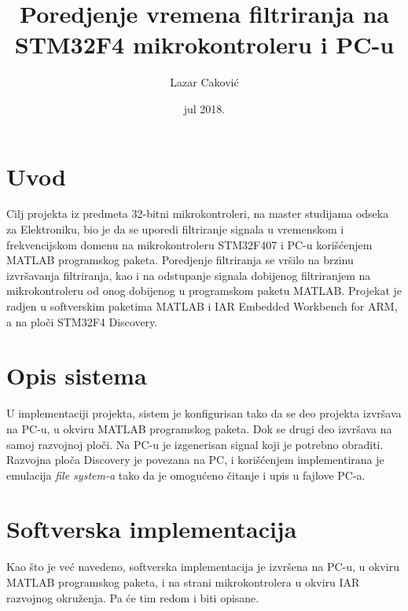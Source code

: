\documentclass[a4paper,12pt, projekat]{etf}
\title{Poredjenje vremena filtriranja na STM32F4 mikrokontroleru i PC-u}
\author{Lazar Caković}
\date{jul 2018.}
\begin{document}
	\maketitle

	\tableofcontents

	\listoffigures

	\newpage

	\chapter{Uvod}
        Cilj projekta iz predmeta 32-bitni mikrokontroleri, na master studijama odseka
        za Elektroniku, bio je da se uporedi filtriranje signala u vremenskom i frekvencijskom
		domenu na mikrokontroleru STM32F407 i PC-u kori\v{s}\'{c}enjem MATLAB programskog paketa.
		Poredjenje filtriranja se vr\v{s}ilo na brzinu izvr\v{s}avanja filtriranja, kao i na 
		odstupanje signala dobijenog filtriranjem na mikrokontroleru od onog dobijenog u programskom
		paketu MATLAB. Projekat je radjen u softverskim paketima MATLAB i IAR Embedded Workbench for ARM,
		a na plo\v{c}i STM32F4 Discovery. 

        \newpage

        \chapter{Opis sistema}
		U implementaciji projekta, sistem je konfigurisan tako da se deo projekta izvr\v{s}ava na PC-u,
		u okviru MATLAB programskog paketa. Dok se drugi deo izvr\v{s}ava na samoj razvojnoj plo\v{c}i.
		Na PC-u je izgenerisan signal koji je potrebno obraditi. Razvojna plo\v{c}a Discovery je povezana
		na PC, i kori\v{s}\'{c}enjem  implementirana je emulacija \textit{file system-a}
		tako da je omogu\'{c}eno \v{c}itanje i upis u fajlove PC-a.

        \newpage

        \chapter{Softverska implementacija}
		Kao \v{s}to je ve\'{c} navedeno, softverska implementacija je izvr\v{s}ena na PC-u, u okviru MATLAB
		programskog paketa, i na strani mikrokontrolera u okviru IAR razvojnog okru\v{z}enja. Pa \'{c}e tim
		redom i biti opisane.
		
\end{document}
